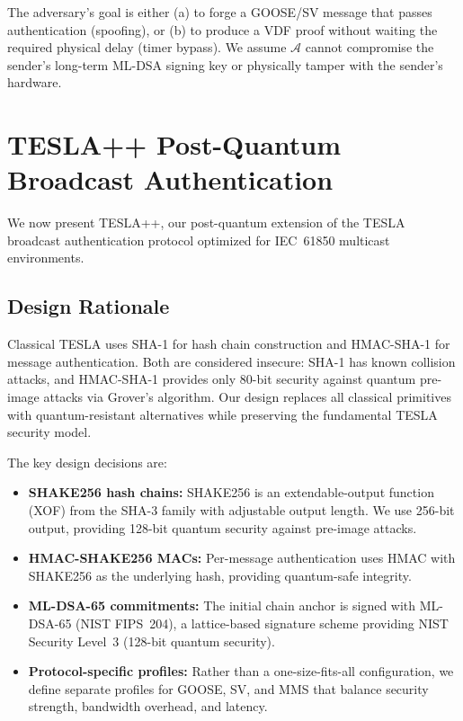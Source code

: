 \documentclass[conference,10pt]{IEEEtran}
\newcommand{\GOOSE}{\textsf{GOOSE}}
\newcommand{\SV}{\textsf{SV}}
\newcommand{\MMS}{\textsf{MMS}}
\begin{document}
The adversary's goal is either (a) to forge a \GOOSE{}/\SV{} message that passes authentication (spoofing), or (b) to produce a VDF proof without waiting the required physical delay (timer bypass). We assume $\mathcal{A}$ cannot compromise the sender's long-term ML-DSA signing key or physically tamper with the sender's hardware.

\section{TESLA++ Post-Quantum Broadcast Authentication}
\label{sec:tesla}

We now present TESLA++, our post-quantum extension of the TESLA broadcast authentication protocol optimized for IEC~61850 multicast environments.

\subsection{Design Rationale}

Classical TESLA \cite{perrig2000tesla} uses SHA-1 for hash chain construction and HMAC-SHA-1 for message authentication. Both are considered insecure: SHA-1 has known collision attacks, and HMAC-SHA-1 provides only 80-bit security against quantum pre-image attacks via Grover's algorithm. Our design replaces all classical primitives with quantum-resistant alternatives while preserving the fundamental TESLA security model.

The key design decisions are:
\begin{itemize}
  \item \textbf{SHAKE256 hash chains:} SHAKE256 \cite{nistsp800185} is an extendable-output function (XOF) from the SHA-3 family with adjustable output length. We use 256-bit output, providing 128-bit quantum security against pre-image attacks.
  \item \textbf{HMAC-SHAKE256 MACs:} Per-message authentication uses HMAC with SHAKE256 as the underlying hash, providing quantum-safe integrity.
  \item \textbf{ML-DSA-65 commitments:} The initial chain anchor is signed with ML-DSA-65 \cite{nistfips204} (NIST FIPS~204), a lattice-based signature scheme providing NIST Security Level~3 (128-bit quantum security).
  \item \textbf{Protocol-specific profiles:} Rather than a one-size-fits-all configuration, we define separate profiles for \GOOSE{}, \SV{}, and \MMS{} that balance security strength, bandwidth overhead, and latency.
\end{itemize}
\end{document}
